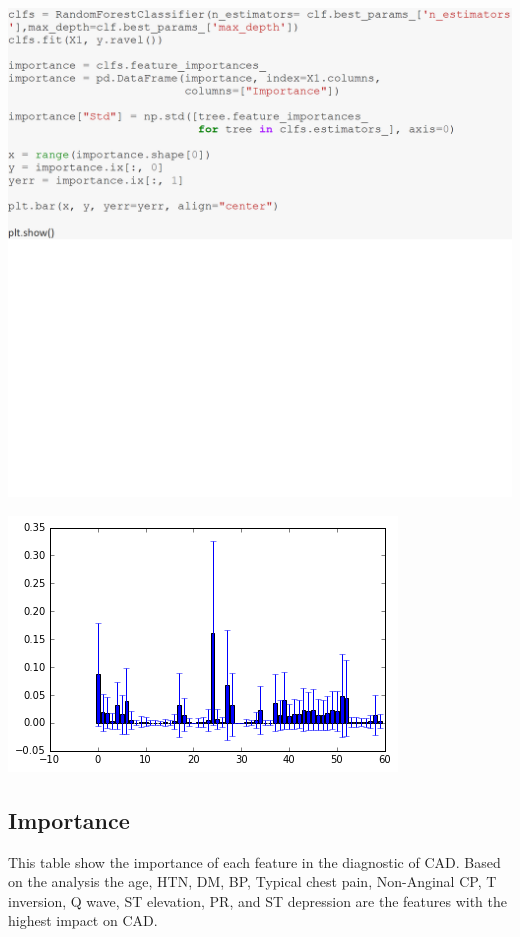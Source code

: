 \documentclass[sigconf]{acmart}
\begin{document}
\includegraphics[width=0.95\columnwidth]{images/Untitled6.png}

\includegraphics[width=0.95\columnwidth]{images/output_17_0.png}


\subsection{Importance}

This table show the importance of each feature in the diagnostic of CAD. Based on the analysis the age, HTN,  DM, BP, Typical chest pain, Non-Anginal  CP, T  inversion, Q  wave,  ST elevation, PR, and ST depression are the features with the highest impact on CAD.
\end{document}
